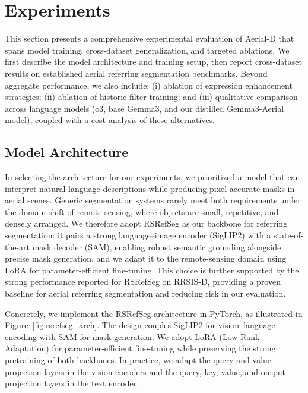 
\section{Experiments}
\label{sec:experiments}

This section presents a comprehensive experimental evaluation of Aerial-D that spans model training, cross-dataset generalization, and targeted ablations. We first describe the model architecture and training setup, then report cross-dataset results on established aerial referring segmentation benchmarks. Beyond aggregate performance, we also include: (i) ablation of expression enhancement strategies; (ii) ablation of historic-filter training; and (iii) qualitative comparison across language models (o3, base Gemma3, and our distilled Gemma3-Aerial model), coupled with a cost analysis of these alternatives.

\subsection{Model Architecture}
\label{subsec:model_architecture}

In selecting the architecture for our experiments, we prioritized a model that can interpret natural-language descriptions while producing pixel-accurate masks in aerial scenes. Generic segmentation systems rarely meet both requirements under the domain shift of remote sensing, where objects are small, repetitive, and densely arranged. We therefore adopt RSRefSeg as our backbone for referring segmentation: it pairs a strong language–image encoder (SigLIP2) with a state-of-the-art mask decoder (SAM), enabling robust semantic grounding alongside precise mask generation, and we adapt it to the remote-sensing domain using LoRA for parameter-efficient fine-tuning. This choice is further supported by the strong performance reported for RSRefSeg on RRSIS-D\cite{liu2024rotated}, providing a proven baseline for aerial referring segmentation and reducing risk in our evaluation.

Concretely, we implement the RSRefSeg architecture\cite{chen2025rsrefseg} in PyTorch, as illustrated in Figure~\ref{fig:rsrefseg_arch}. The design couples SigLIP2\cite{siglip2} for vision–language encoding with SAM\cite{sam} for mask generation. We adopt LoRA (Low-Rank Adaptation)\cite{lora} for parameter‑efficient fine‑tuning while preserving the strong pretraining of both backbones. In practice, we adapt the query and value projection layers in the vision encoders and the query, key, value, and output projection layers in the text encoder.

